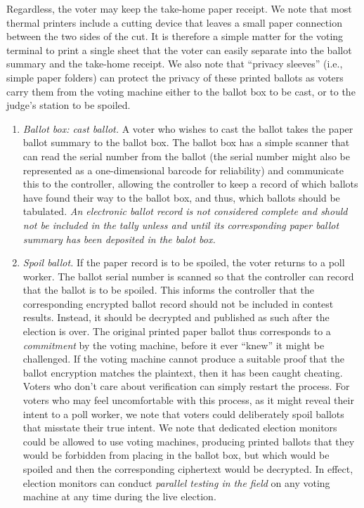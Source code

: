 \begin{enumerate}
 Regardless, the voter may keep the take-home paper receipt.
 We note that most thermal printers include a cutting device that leaves a
 small paper connection between the two sides of the cut.
 It is therefore a simple matter for the voting terminal to print a single
 sheet that the voter can easily separate into the ballot summary and the
 take-home receipt.
 We also note that ``privacy sleeves'' (i.e., simple paper folders) can protect the privacy of these printed ballots as voters carry them from the voting machine either to the ballot box
 to be cast, or to the judge's station to be spoiled.

\begin{enumerate}
\item  {\em Ballot box: cast ballot.}
A voter who wishes to cast the ballot takes the paper ballot summary to the ballot box.
The ballot box has a simple scanner that can read the serial number from the ballot
(the serial number might also be represented as a one-dimensional barcode for reliability)
and communicate this to the controller, allowing the controller to keep a record of which ballots have found their way to the ballot box, and thus, which ballots should be tabulated. 
{\em An electronic ballot record is not considered complete and should not be
 included in the tally unless and until its corresponding paper ballot summary has
 been deposited in the balot box.}

\item {\em Spoil ballot.}
If the paper record is to be spoiled, the voter returns to a poll worker.
The ballot serial number is scanned so that the controller can record
that the ballot is to be spoiled. 
This informs the controller that the corresponding encrypted ballot 
record should not be included in contest results.
Instead, it should be decrypted and published as such after the election is over.
The original printed paper ballot thus corresponds to a {\em commitment\/} 
by the voting machine, before it ever ``knew'' it might be challenged.
 If the voting machine cannot produce a suitable proof that the ballot 
 encryption matches the plaintext,
 then it has been caught cheating.
 Voters who don't care about verification can simply restart the process.
 For voters who may feel uncomfortable with this process,
 as it might reveal their intent to a poll worker,
 we note that voters could deliberately spoil ballots that misstate their true intent. 
 We note that dedicated election monitors could be allowed to use voting machines, 
 producing printed ballots that they would be forbidden from placing in the ballot box, 
 but which would be spoiled and then the corresponding ciphertext would be decrypted. 
 In effect, election monitors can conduct 
 {\em parallel testing in the field\/} on any voting machine at any time during the live election.



\end{enumerate}
\end{enumerate}
